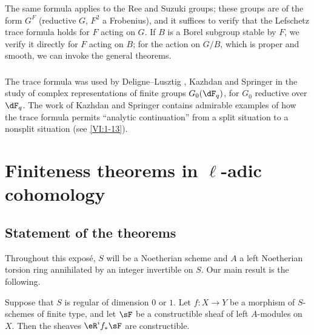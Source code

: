 \documentclass[oneside]{book}
\begin{document}
The same formula applies to the Ree and Suzuki groups; these groups are 
of the form $G^F$ (reductive $G$, $F^2$ a Frobenius), and it suffices to 
verify that the Lefschetz trace formula holds for $F$ acting 
on $G$. If $B$ is a Borel subgroup stable by $F$, we verify it 
directly for $F$ acting on $B$; for the action on $G/B$, which is proper and 
smooth, we can invoke the general theorems. 





\subsection{}\label{VI:8-3}

The trace formula was used by Deligne--Lusztig \cite{dl76}, 
Kazhdan \cite{ka77} and Springer \cite{sp76} in the study of 
complex representations of finite groups $G_0(\dF_q)$, for $G_0$ 
reductive over $\dF_q$. The work of Kazhdan and Springer contains 
admirable examples of how the trace formula permits ``analytic 
continuation'' from a split situation to a nonsplit situation 
(see \ref{VI:1-13}).




\chapter{Finiteness theorems in \texorpdfstring{$\ell$}{l}-adic cohomology}\label{VII}











\section{Statement of the theorems}\label{VII:1}

Throughout this exposé, $S$ will be a Noetherian scheme and $A$ a left
Noetherian torsion ring annihilated by an integer invertible on $S$. Our main
result is the following.






\begin{theorem_}\label{VII:1-1}
Suppose that $S$ is regular of dimension $0$ or $1$. Let $f:X\to Y$ be a
morphism of $S$-schemes of finite type, and let $\sF$ be a constructible sheaf
of left $A$-modules on $X$. Then the sheaves $\eR^i f_\ast \sF$ are
constructible.
\end{theorem_}
\end{document}
